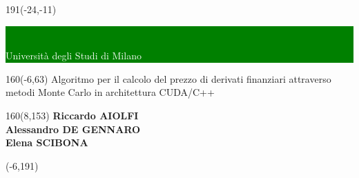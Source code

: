 \thispagestyle{empty}
\newcommand{\form}[1]{\scalebox{1.087}{\boldmath{#1}}}
\sffamily
%
\begin{textblock}{191}(-24,-11)
\colorbox{green}{\hspace{123mm}\ \parbox[c][18truemm]{68mm}{\textcolor{white}{Università degli Studi di Milano}}}
\end{textblock}
%
%
\begin{textblock}{160}(-6,63)
\textblockcolour{}
\vspace{-\parskip}
\flushleft
\fontsize{40}{42}\selectfont \textcolor{bluetitle}{Algoritmo per il calcolo del prezzo di derivati finanziari attraverso metodi Monte Carlo in architettura CUDA/C++}\\[1.5mm]
\end{textblock}
%
%
\begin{textblock}{160}(8,153)
\textblockcolour{}
\vspace{-\parskip}
\flushright
\fontsize{14}{16}\selectfont \textbf{Riccardo AIOLFI} \\
\fontsize{14}{16}\selectfont \textbf{Alessandro DE GENNARO} \\
\fontsize{14}{16}\selectfont \textbf{Elena SCIBONA} \\
\end{textblock}
%
\begin{textblock}{70}(-6,191)
\textblockcolour{}
\vspace{-\parskip}
\flushleft
\end{textblock}
